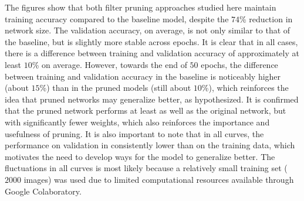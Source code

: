 \documentclass{article}
\begin{document}
The figures show that both filter pruning approaches studied here maintain training accuracy compared to the baseline model, despite the $74$\% reduction in network size. The validation accuracy, on average, is not only similar to that of the baseline, but is slightly more stable across epochs. It is clear that in all cases, there is a difference between training and validation accuracy of approximately at least $10$\% on average. However, towards the end of $50$ epochs, the difference between training and validation accuracy in the baseline is noticeably higher (about $15$\%) than in the pruned models (still about $10$\%), which reinforces the idea that pruned networks may generalize better, as hypothesized. It is confirmed that the pruned network performs at least as well as the original network, but with significantly fewer weights, which also reinforces the importance and usefulness of pruning. It is also important to note that in all curves, the performance on validation in consistently lower than on the training data, which motivates the need to develop ways for the model to generalize better. The fluctuations in all curves is most likely because a relatively small training set ($2000$ images) was used due to limited computational resources available through Google Colaboratory.
%
\end{document}
